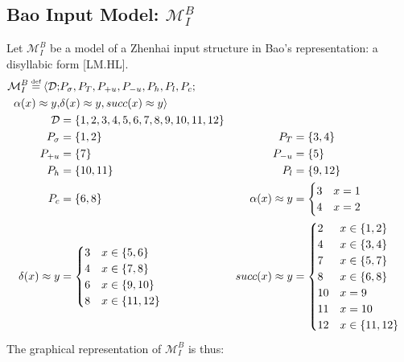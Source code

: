 \documentclass{article}
\newcommand\myeq{\mathrel{\stackrel{\makebox[0pt]{\mbox{\normalfont\tiny def}}}{=}}}
\newcommand{\ap}{\approx}
\begin{document}
\subsection{Bao Input Model: $\mathcal{M}^{B}_{I}$}
Let $\mathcal{M}^{B}_{I}$ be a model of a Zhenhai input structure in Bao's representation: a disyllabic form [LM.HL].
\begin{equation}
\begin{aligned}
\mathcal{M}^{B}_{I} \myeq \langle \mathcal{D}; &P_{\sigma}, P_{T}, P_{+u}, P_{-u}, P_{h}, P_{l}, P_{c}; \\
\alpha(x)\ap y, &\delta(x)\ap y, succ(x)\ap y \rangle \\
\mathcal{D} &= \{1, 2, 3, 4, 5, 6, 7, 8, 9, 10, 11, 12\}  \\
P_{\sigma} &= \{1, 2\} & P_{T} &= \{3, 4\} \\
P_{+u} &= \{7\} & P_{-u} &= \{5\} \\
P_{h} &= \{10, 11\} & P_{l} &= \{9, 12\} \\ 
P_{c} &= \{6, 8\}& \alpha(x)\ap y &= \begin{cases} 3 & x=1 \\ 4 & x=2 \end{cases}  \\
 \delta(x)\ap y &= \begin{cases} 3 & x\in\{5,6\} \\ 4 & x\in \{7,8\} \\ 6 & x\in\{9,10\} \\ 8 & x\in\{11,12\} \end{cases} &
succ(x)\ap y &= \begin{cases} 2 & x\in \{1,2\} \\ 4 & x\in \{3,4\} \\ 7 & x\in\{5,7\} \\ 8 & x\in\{6,8\} \\ 10 & x=9 \\ 11 & x=10 \\ 12 & x\in\{11,12\} \end{cases} \\
\end{aligned}
\end{equation}
The graphical representation of $\mathcal{M}^{B}_{I}$ is thus:
\end{document}
